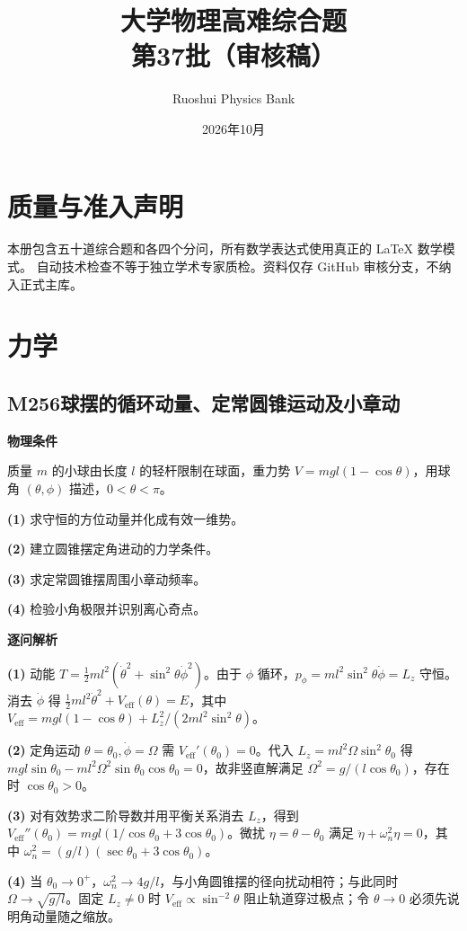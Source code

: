 \documentclass[UTF8,a4paper,11pt,oneside,openany]{ctexbook}
\begin{document}
\title{\textcolor{accent}{大学物理高难综合题}\\\Large 第37批（审核稿）}
\author{Ruoshui Physics Bank}
\date{2026年10月}
\maketitle
\tableofcontents
\chapter*{质量与准入声明}
本册包含五十道综合题和各四个分问，所有数学表达式使用真正的 \LaTeX{} 数学模式。
自动技术检查不等于独立学术专家质检。资料仅存 GitHub 审核分支，不纳入正式主库。

\chapter{力学}
\section*{M256\quad 球摆的循环动量、定常圆锥运动及小章动}
\textbf{物理条件}\par 质量 \(m\) 的小球由长度 \(l\) 的轻杆限制在球面，重力势 \(V=mgl(1-\cos\theta)\)，用球角 \((\theta,\phi)\) 描述，\(0<\theta<\pi\)。
\par\noindent\textbf{(1)} 求守恒的方位动量并化成有效一维势。
\par\noindent\textbf{(2)} 建立圆锥摆定角进动的力学条件。
\par\noindent\textbf{(3)} 求定常圆锥摆周围小章动频率。
\par\noindent\textbf{(4)} 检验小角极限并识别离心奇点。

\par\medskip\noindent\textbf{逐问解析}
\par\noindent\textbf{(1)} 动能 \(T=\frac12ml^2(\dot\theta^2+\sin^2\theta\dot\phi^2)\)。由于 \(\phi\) 循环，\(p_\phi=ml^2\sin^2\theta\dot\phi=L_z\) 守恒。消去 \(\dot\phi\) 得 \(\frac12ml^2\dot\theta^2+V_{\mathrm{eff}}(\theta)=E\)，其中 \(V_{\mathrm{eff}}=mgl(1-\cos\theta)+L_z^2/(2ml^2\sin^2\theta)\)。
\par\noindent\textbf{(2)} 定角运动 \(\theta=\theta_0,\dot\phi=\Omega\) 需 \(V_{\mathrm{eff}}'(\theta_0)=0\)。代入 \(L_z=ml^2\Omega\sin^2\theta_0\) 得 \(mgl\sin\theta_0-ml^2\Omega^2\sin\theta_0\cos\theta_0=0\)，故非竖直解满足 \(\Omega^2=g/(l\cos\theta_0)\)，存在时 \(\cos\theta_0>0\)。
\par\noindent\textbf{(3)} 对有效势求二阶导数并用平衡关系消去 \(L_z\)，得到 \(V_{\mathrm{eff}}''(\theta_0)=mgl(1/\cos\theta_0+3\cos\theta_0)\)。微扰 \(\eta=\theta-\theta_0\) 满足 \(\ddot\eta+\omega_n^2\eta=0\)，其中 \(\omega_n^2=(g/l)(\sec\theta_0+3\cos\theta_0)\)。
\par\noindent\textbf{(4)} 当 \(\theta_0\to0^+\)，\(\omega_n^2\to4g/l\)，与小角圆锥摆的径向扰动相符；与此同时 \(\Omega\to\sqrt{g/l}\)。固定 \(L_z\ne0\) 时 \(V_{\mathrm{eff}}\propto\sin^{-2}\theta\) 阻止轨道穿过极点；令 \(\theta\to0\) 必须先说明角动量随之缩放。
\end{document}
